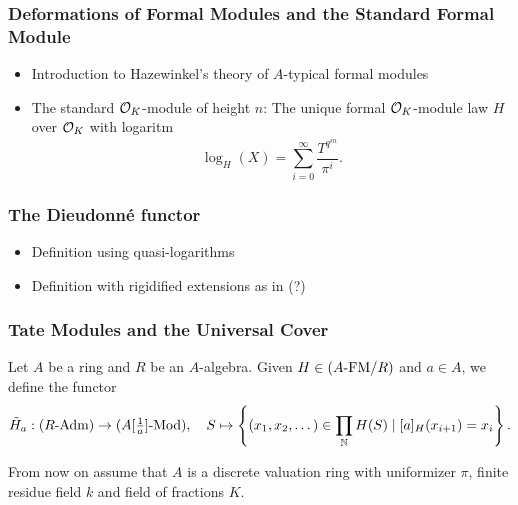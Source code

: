 \subsubsection{Deformations of Formal Modules and the Standard Formal Module} %
\label{ssub:Deformations of Formal Modules and the Standard Formal Module}
\begin{itemize}
  \item Introduction to Hazewinkel's theory of $A$-typical formal modules
  \item The standard $\mathcal{O}_K$-module of height $n$: The unique formal $\mathcal{O}_K$-module law $H$ over
    $\mathcal{O}_K$ with logaritm 
    \begin{equation*}
      \log_H(X) = \sum_{i = 0}^\infty \frac{T^{q^{in}}}{\pi^i}.
    \end{equation*}
\end{itemize}


\subsubsection{The Dieudonn\'e functor} %
\label{ssub:The Dieudonne functor}
\begin{itemize}
  \item Definition using quasi-logarithms
  \item Definition with rigidified extensions as in \cite{hopkins1994equivariant} (?)
\end{itemize}

\subsubsection{Tate Modules and the Universal Cover} %
\label{sub:Tate Modules and the Universal Cover}
Let $A$ be a ring and $R$ be an $A$-algebra. Given $H \in {({A}\text-\mathrm{FM}/{R})}$ and $a \in A$,
we define the functor 
\begin{equation*}
  \Tilde H_a : {({R}\text-\mathrm{Adm})} \to {({A[\tfrac 1a]}\text-\mathrm{Mod})}, \quad
  S \mapsto \left\{(x_1, x_2, \dots) \in \prod_{\mathbb{N}} H(S) \mid [a]_H(x_{i+1}) =
  x_i \right\}.
\end{equation*}

From now on assume that $A$ is a discrete valuation ring with uniformizer
$\pi$, finite residue field $k$ and field of fractions $K$. 

